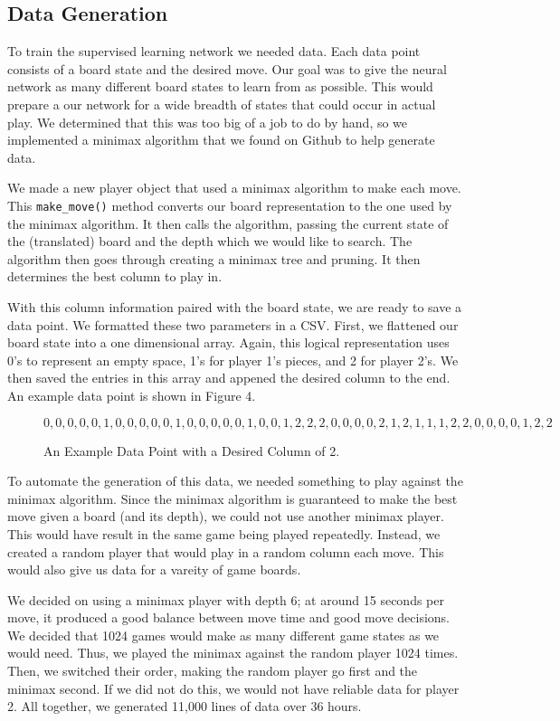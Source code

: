 \documentclass[12pt]{article}
\begin{document}
\subsection{Data Generation}
To train the supervised learning network we needed data. Each data point consists of a board state and the desired move. Our goal was to give the neural network as many different board states to learn from as possible. This would prepare a our network for a wide breadth of states that could occur in actual play. We determined that this was too big of a job to do by hand, so we implemented a minimax algorithm that we found on Github to help generate data. 

We made a new player object that used a minimax algorithm to make each move.
This \lstinline|make_move()| method converts our board representation to the one used by the minimax algorithm. It then calls the algorithm, passing the current state of the (translated) board and the depth which we would like to search. The algorithm then goes through creating a minimax tree and pruning. It then determines the best column to play in.

With this column information paired with the board state, we are ready to save a data point. We formatted these two parameters in a CSV. First, we flattened our board state into a one dimensional array. Again, this logical representation uses 0's to represent an empty space, 1's for player 1's pieces, and 2 for player 2's. We then saved the entries in this array and appened the desired column to the end. An example data point is shown in Figure 4.

\begin{figure}[H]
$$0, 0, 0, 0, 0, 1, 0, 0, 0, 0, 0, 1, 0, 0, 0, 0, 0, 1, 0, 0, 1, 2, 2, 2, 0, 0, 0, 0, 2, 1, 2, 1, 1, 1, 2, 2, 0, 0, 0, 0, 1, 2, 2$$
\caption{An Example Data Point with a Desired Column of 2.}
\end{figure}


\doublespacing

To automate the generation of this data, we needed something to play against the minimax algorithm. Since the minimax algorithm is guaranteed to make the best move given a board (and its depth), we could not use another minimax player. This would have result in the same game being played repeatedly. Instead, we created a random player that would play in a random column each move. This would also give us data for a vareity of game boards.

We decided on using a minimax player with depth 6; at around 15 seconds per move, it produced a good balance between move time and good move decisions. We decided that 1024 games would make as many different game states as we would need. Thus, we played the minimax against the random player 1024 times. Then, we switched their order, making the random player go first and the minimax second. If we did not do this, we would not have reliable data for player 2. All together, we generated 11,000 lines of data over 36 hours.
\end{document}
